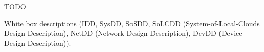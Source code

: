 %
%

TODO

White box descriptions (IDD, SysDD, SoSDD, SoLCDD (System-of-Local-Clouds Design Description), NetDD (Network Design Description), DevDD (Device Design Description)).